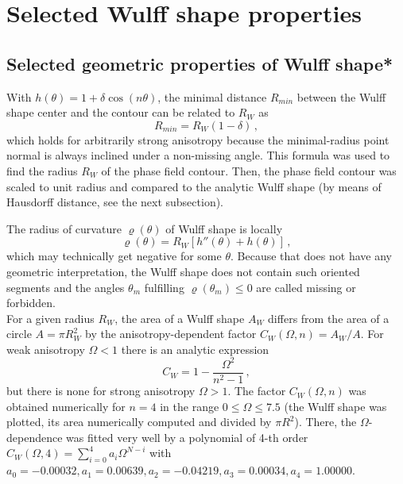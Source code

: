 \chapter{Selected Wulff shape properties} \label{ch_appendix_wulff_properties}
\section{Selected geometric properties of Wulff shape*}\label{sec_appendix_anisofun_props}
With $h(\theta)=1+\delta\cos(n\theta)$, the minimal distance $R_{min}$ between the Wulff shape center and the contour can be related to $R_W$ as
\begin{equation} \label{eq_appdx_wulff_minradius}
	R_{min} = R_W(1-\delta) \,,
\end{equation}
which holds for arbitrarily strong anisotropy because the minimal-radius point normal is always inclined under a non-missing angle. This formula was used to find the radius $R_W$ of the phase field contour. Then, the phase field contour was scaled to unit radius and compared to the analytic Wulff shape (by means of Hausdorff distance, see the next subsection). 

The radius of curvature $\varrho(\theta)$ of Wulff shape is locally
\begin{equation} \label{eq_Wulff_radius_curvature}
	\varrho(\theta) = R_W[h''(\theta) + h(\theta)] \,,
\end{equation}
which may technically get negative for some $\theta$. Because that does not have any geometric interpretation, the Wulff shape does not contain such oriented segments and the angles $\theta_m$ fulfilling $\varrho(\theta_m)\leq0$ are called missing or forbidden. \\

For a given radius $R_W$, the area of a Wulff shape $A_W$ differs from the area of a circle $A=\pi R_W^2$ by the anisotropy-dependent factor $C_W(\Omega,n) = A_W/A$. For weak anisotropy $\Omega<1$ there is an analytic expression 
\begin{equation}
	C_W = 1-\frac{\Omega^2}{n^2-1} \,,
\end{equation}
but there is none for strong anisotropy $\Omega>1$. The factor $C_W(\Omega,n)$ was obtained numerically for $n=4$ in the range $0\leq\Omega\leq7.5$ (the Wulff shape was plotted, its area numerically computed and divided by $\pi R^2$). There, the $\Omega$-dependence was fitted very well  by a polynomial of 4-th order $C_W(\Omega,4)= \sum_{i=0}^4a_i\Omega^{N-i}$ with $a_0=-0.00032 ,a_1=0.00639 ,a_2=-0.04219 , a_3=0.00034 , a_4=1.00000$. 

